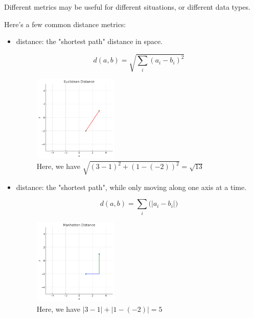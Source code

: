         Different metrics may be useful for different situations, or different data types.

        Here's a few common distance metrics:

        \begin{itemize}
            \item {} distance: the "shortest path" distance in space.

                \begin{equation}
                    d(a,b) = \sqrt{\sum_i (a_i-b_i)^2}
                \end{equation}

                \begin{figure}[H]
                    \centering
                    \includegraphics[width=40mm,scale=0.5]{images/nonparametric_images/euclidean_distance.png}
                    \caption*{Here, we have $\sqrt{(3-1)^2+(1-(-2))^2}=\sqrt{13}$}
                \end{figure}
                
            \item {} distance: the "shortest path", while only moving along one axis at a time.

                \begin{equation}
                    d(a,b) = \sum_i \Big(\big| a_i-b_i \big| \Big)
                \end{equation}

                \begin{figure}[H]
                    \centering
                    \includegraphics[width=40mm,scale=0.5]{images/nonparametric_images/manhattan_distance.png}
                    \caption*{Here, we have $|3-1|+|1-(-2)|=5$}
                \end{figure}
                


\end{itemize}
